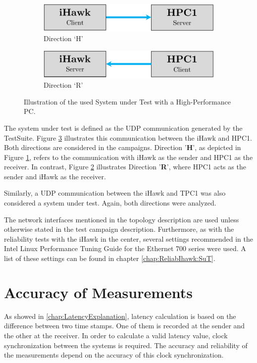 \begin{figure}[h]
    \centering
    \begin{subfigure}[b]{0.48\textwidth}
        \centering
        \includegraphics[width=\textwidth]{figures/performance/sut_1a.pdf}
        \caption{Direction `H'}
        \label{fig:SutHpcPerf:H}
    \end{subfigure}
    \hfill
    \begin{subfigure}[b]{0.48\textwidth}
        \centering
        \includegraphics[width=\textwidth]{figures/performance/sut_1b.pdf}
        \caption{Direction `R'}
        \label{fig:SutHpcPerf:R}
    \end{subfigure}
    \caption{Illustration of the used System under Test with a High-Performance PC.}
    \label{fig:SutHpcPerf}
\end{figure}

The system under test is defined as the UDP communication generated by the TestSuite. Figure  \ref{fig:SutHpcPerf} illustrates this communication between the iHawk and HPC1. Both directions are considered in the campaigns. Direction '\textbf{H}', as depicted in Figure \ref{fig:SutHpcPerf:H}, refers to the communication with iHawk as the sender and HPC1 as the receiver. In contrast, Figure \ref{fig:SutHpcPerf:R} illustrates Direction '\textbf{R}', where HPC1 acts as the sender and iHawk as the receiver.

Similarly, a UDP communication between the iHawk and TPC1 was also considered a system under test. Again, both directions were analyzed.

The network interfaces mentioned in the topology description are used unless otherwise stated in the test campaign description. Furthermore, as with the reliability tests with the iHawk in the center, several settings recommended in the Intel Linux Performance Tuning Guide for the Ethernet 700 series were used. A list of these settings can be found in chapter \ref{chap:ReliabIhawk:SuT}.

\section{Accuracy of Measurements}
As showed in \ref{chap:LatencyExplanation}, latency calculation is based on the difference between two time stamps. One of them is recorded at the sender and the other at the receiver. In order to calculate a valid latency value, clock synchronization between the systems is required. The accuracy and reliability of the measurements depend on the accuracy of this clock synchronization.

